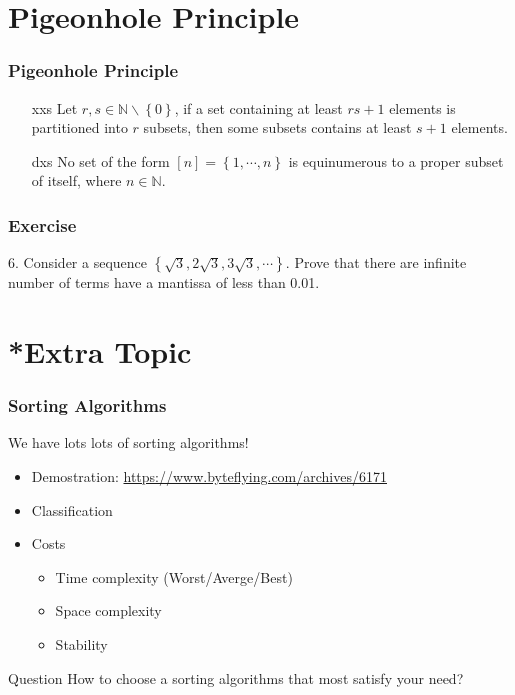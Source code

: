 \documentclass{beamer}
\begin{document}
\section{Pigeonhole Principle}
\begin{frame}
    \frametitle{Pigeonhole Principle}
    \vv 
    \begin{enumerate}
        \item[xxs] Let $r,s \in \mathbb{N} \backslash\!\left\lbrace 0 \right\rbrace $, 
        if a set containing at least ${rs} + 1$ elements is partitioned into $r$ subsets, 
        then some subsets contains at least $s + 1$ elements.
        \item[dxs] No set of the form $[n] = \left\lbrace 1, \cdots, n\right\rbrace$ 
        is equinumerous to a proper subset of itself, 
        where $n \in \mathbb{N}$.
	\end{enumerate}
\end{frame}
\begin{frame}
    \frametitle{Exercise}
    6. Consider a sequence $\left\lbrace \sqrt{3}, 2\sqrt{3}, 3\sqrt{3}, \cdots \right\rbrace$.
    Prove that there are infinite number of terms have a mantissa of less than 0.01.
    

\end{frame}
\section{*Extra Topic}
\begin{frame}
    \frametitle{Sorting Algorithms}
    We have lots lots of sorting algorithms!
    \vv
    \begin{itemize}
        \item Demostration: \url{https://www.byteflying.com/archives/6171}
        \item Classification
        \item Costs
                \begin{itemize}
                    \item Time complexity (Worst/Averge/Best)
                    \item Space complexity
                    \item Stability
                \end{itemize}
    \end{itemize}
    \begin{block}{Question}
        \hh How to choose a sorting algorithms that most satisfy your need?
    \end{block}
\end{frame}
\end{document}
